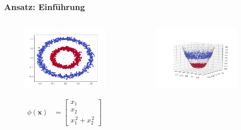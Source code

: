 	\begin{frame}
	\frametitle{Ansatz: Einführung}
		\begin{columns}
			\begin{column}{.4\textwidth}
				\begin{figure}
					\includegraphics[width=1\textwidth]{img/nonlinearsvm.png}
				\end{figure}
				\begin{align*}
					\phi(\boldsymbol{x}) &=  \begin{bmatrix}
									x_{1} \\
									x_{2} \\
									x_{1}^{\,2} + x_{2}^{\,2}
								\end{bmatrix}
				\end{align*}
			\end{column}
			\begin{column}{.6\textwidth}
				\begin{figure}
					\includegraphics[width=1\textwidth]{img/nonlinearsvm3d.png}
				\end{figure}
				\vspace{45pt}
			\end{column}
		\end{columns}
	\end{frame}
	
